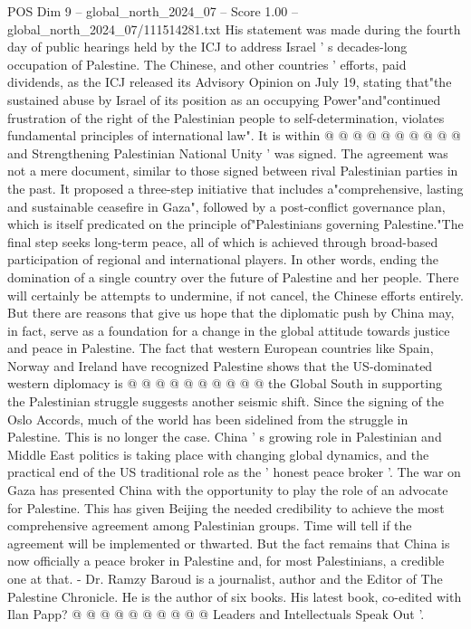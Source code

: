 \begin{textsample}{POS Dim 9 – global\_north\_2024\_07 – Score 1.00 – global\_north\_2024\_07/111514281.txt}
His statement was made during the fourth day of public hearings held by the ICJ to address Israel ' s decades-long occupation of Palestine.
The Chinese, and other countries ' efforts, paid dividends, as the ICJ released its Advisory Opinion on July 19, stating that"the sustained abuse by Israel of its position as an occupying Power"and"continued frustration of the right of the Palestinian people to self-determination, violates fundamental principles of international law".
It is within @ @ @ @ @ @ @ @ @ @ and Strengthening Palestinian National Unity ' was signed.
The agreement was not a mere document, similar to those signed between rival Palestinian parties in the past.
It proposed a three-step initiative that includes a"comprehensive, lasting and sustainable ceasefire in Gaza", followed by a post-conflict governance plan, which is itself predicated on the principle of"Palestinians governing Palestine."The final step seeks long-term peace, all of which is achieved through broad-based participation of regional and international players.
In other words, ending the domination of a single country over the future of Palestine and her people.
There will certainly be attempts to undermine, if not cancel, the Chinese efforts entirely.
But there are reasons that give us hope that the diplomatic push by China may, in fact, serve as a foundation for a change in the global attitude towards justice and peace in Palestine.
The fact that western European countries like Spain, Norway and Ireland have recognized Palestine shows that the US-dominated western diplomacy is @ @ @ @ @ @ @ @ @ @ the Global South in supporting the Palestinian struggle suggests another seismic shift.
Since the signing of the Oslo Accords, much of the world has been sidelined from the struggle in Palestine.
This is no longer the case.
China ' s growing role in Palestinian and Middle East politics is taking place with changing global dynamics, and the practical end of the US traditional role as the ' honest peace broker '.
The war on Gaza has presented China with the opportunity to play the role of an advocate for Palestine.
This has given Beijing the needed credibility to achieve the most comprehensive agreement among Palestinian groups.
Time will tell if the agreement will be implemented or thwarted.
But the fact remains that China is now officially a peace broker in Palestine and, for most Palestinians, a credible one at that. - Dr.
Ramzy Baroud is a journalist, author and the Editor of The Palestine Chronicle.
He is the author of six books.
His latest book, co-edited with Ilan Papp? @ @ @ @ @ @ @ @ @ @ Leaders and Intellectuals Speak Out '.

\end{textsample}
